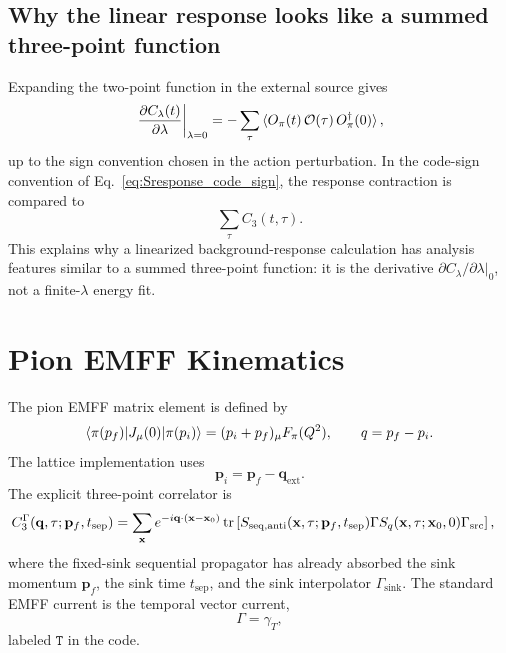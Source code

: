 \documentclass[11pt,a4paper]{article}
\newcommand{\Ocur}{\mathcal{O}}
\newcommand{\gsrc}{\Gamma_{\mathrm{src}}}
\newcommand{\gsink}{\Gamma_{\mathrm{sink}}}
\newcommand{\Cthree}{C_3}
\begin{document}
\subsection{Why the linear response looks like a summed three-point function}

Expanding the two-point function in the external source gives
\begin{equation}
  \left.
  \frac{\partial C_\lambda(t)}{\partial\lambda}
  \right|_{\lambda=0}
  =
  -\sum_\tau
  \braket{
    O_\pi(t)\,
    \Ocur(\tau)\,
    O_\pi^\dagger(0)
  },
\label{eq:dC_summed_3pt_sign}
\end{equation}
up to the sign convention chosen in the action perturbation.  In the code-sign
convention of Eq.~\eqref{eq:Sresponse_code_sign}, the response contraction is
compared to
\begin{equation}
  \sum_\tau \Cthree(t,\tau).
\end{equation}
This explains why a linearized background-response calculation has analysis
features similar to a summed three-point function: it is the derivative
\(\partial C_\lambda/\partial\lambda|_0\), not a finite-\(\lambda\) energy fit.

\section{Pion EMFF Kinematics}

The pion EMFF matrix element is defined by
\begin{equation}
  \braket{\pi(p_f)|J_\mu(0)|\pi(p_i)}
  =
  (p_i+p_f)_\mu F_\pi(Q^2),
  \qquad
  q=p_f-p_i .
\end{equation}
The lattice implementation uses
\begin{equation}
  \mathbf p_i = \mathbf p_f - \mathbf q_{\mathrm{ext}}.
\end{equation}
The explicit three-point correlator is
\begin{align}
  \Cthree^\Gamma(\mathbf q,\tau;\mathbf p_f,t_{\mathrm{sep}})
  &=
  \sum_{\mathbf x}
  e^{-i\mathbf q\cdot(\mathbf x-\mathbf x_0)}
  \tr\left[
    S_{\mathrm{seq,anti}}(\mathbf x,\tau;\mathbf p_f,t_{\mathrm{sep}})
    \Gamma
    S_q(\mathbf x,\tau;\mathbf x_0,0)
    \gsrc
  \right],
\label{eq:explicit_emff_c3}
\end{align}
where the fixed-sink sequential propagator has already absorbed the sink
momentum \(\mathbf p_f\), the sink time \(t_{\mathrm{sep}}\), and the sink
interpolator \(\gsink\).  The standard EMFF current is the temporal vector
current,
\begin{equation}
  \Gamma = \gamma_T,
\end{equation}
labeled \(\texttt{T}\) in the code.
\end{document}
